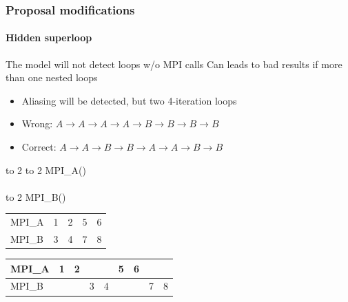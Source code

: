 \documentclass{beamer}
\begin{document}
\begin{frame}
\frametitle{Proposal modifications}
\framesubtitle{Hidden superloop}
The model will not detect loops w/o MPI calls
Can leads to bad results if more than one nested loops
\begin{itemize}
	\item Aliasing will be detected, but two 4-iteration loops
	\item Wrong: $A \rightarrow A \rightarrow A \rightarrow A \rightarrow B \rightarrow B \rightarrow B \rightarrow B$
	\item Correct: $A \rightarrow A \rightarrow B \rightarrow B \rightarrow A \rightarrow A \rightarrow B \rightarrow B$
\end{itemize}
\begin{multicols}{2}
	\begin{pseudocode}{ }{ }
		 to 2 \DO
		\BEGIN
			 to 2 \DO
			\BEGIN
				MPI\_A()\\
			\END\\
			 to 2 \DO
			\BEGIN
				MPI\_B()\\
			\END
		\END
	\end{pseudocode}
	\pause
	\columnbreak
	\begin{table}[]
		\centering
		\begin{tabular}{l | llll}
			MPI\_A & 1 & 2 & 5 & 6 \\ 
			MPI\_B & 3 & 4 & 7 & 8
		\end{tabular}
	\end{table}
	\pause
	\begin{table}[]
	\centering
	\begin{tabular}{l | llllllll}
		MPI\_A & 1 & 2 &   &   & 5 & 6 &   &   \\ \hline
		MPI\_B &   &   & 3 & 4 &   &   & 7 & 8
	\end{tabular}
	\end{table}
\end{multicols}
\end{frame}
\end{document}
